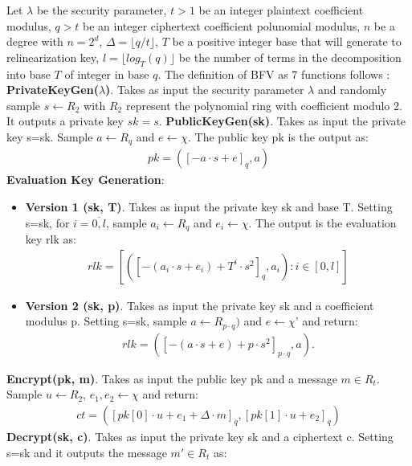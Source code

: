 \documentclass[A4paper,12pt]{article}
\begin{document}
Let $\lambda$ be the security parameter, $t > 1$ be an integer plaintext coefficient modulus, $q > t$ be an integer ciphertext coefficient polunomial modulus, $n$ be a degree with $n = 2^d$, $\Delta = \lfloor q/t \rfloor$, $T$ be a positive integer base that will generate to relinearization key, $l= \lfloor log_T(q) \rfloor$ be the number of terms in the decomposition into base $T$ of integer in base $q$. The definition of BFV as 7 functions follows \cite{SHE}: \newline
\textbf{PrivateKeyGen($\lambda$)}. Takes as input the security parameter $\lambda$ and randomly sample $s \leftarrow R_2$ with $R_2$ represent the polynomial ring with coefficient modulo 2. It outputs a private key $sk=s$. \newline	
\textbf{PublicKeyGen(sk)}. Takes as input the private key s=sk. Sample $a \leftarrow R_q$ and $e \leftarrow \chi$. The public key pk is the output as:
	\begin{align*}
	pk = ([-a\cdot s + e]_q, a)
	\end{align*}	
\textbf{Evaluation Key Generation}:
	\begin{itemize}
		\item \textbf{Version 1 (sk, T)}. Takes as input the private key sk and base T. Setting s=sk, for $i = \overline{0, l}  $, sample $a_i \leftarrow R_q$ and $e_i \leftarrow \chi$. The output is the evaluation key rlk as:
		\begin{align*}
		rlk = [([-(a_i \cdot s + e_i) + T^i \cdot s^2]_q , a_i) : i \in [0,l]]
		\end{align*}
		
		\item \textbf{Version 2 (sk, p)}. Takes as input the private key sk and a coefficient modulus p. Setting s=sk, sample $a \leftarrow R_{p \cdot q})$ and $e \leftarrow \chi$'  and return:
		\begin{align*}
		rlk = ([-(a \cdot s + e) + p \cdot s^2]_{p \cdot q}, a).
		\end{align*}
		
	\end{itemize}	
\textbf{Encrypt(pk, m)}. Takes as input the public key pk and a message $m \in R_t$. Sample $u \leftarrow R_2$, $e_1, e_2 \leftarrow \chi$ and return:
	\begin{align*}
		ct = ([pk[0] \cdot u + e_1 + \Delta \cdot m]_q ,  [ pk[1] \cdot u + e_2]_q)
	\end{align*}	
\textbf{Decrypt(sk, c)}. Takes as input the private key sk and a ciphertext c. Setting s=sk and it outputs the message $m' \in R_t$ as:
\end{document}
